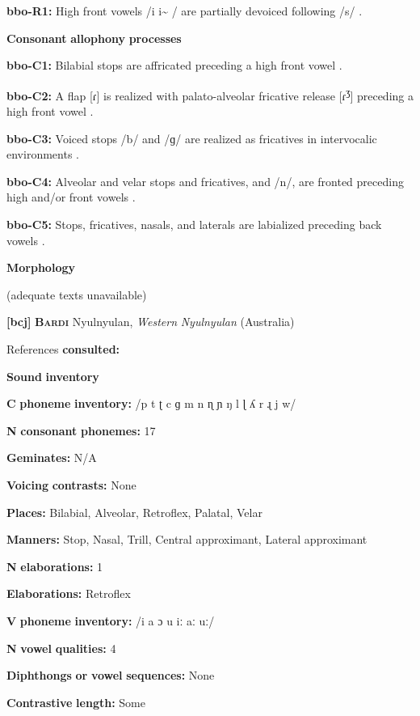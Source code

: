 \textbf{bbo-R1:} High front vowels /i i\~{} / are partially devoiced following /s/ \citep[28-9]{Morse1976}.

\textbf{Consonant} \textbf{allophony} \textbf{processes}

\textbf{bbo-C1:} Bilabial stops are affricated preceding a high front vowel \citep[20]{Morse1976}.

\textbf{bbo-C2:} A flap [ɾ] is realized with palato-alveolar fricative release [ɾ\textsuperscript{ʒ}] preceding a high front vowel \citep[25]{Morse1976}.

\textbf{bbo-C3:} Voiced stops /b/ and /ɡ/ are realized as fricatives in intervocalic environments \citep[22]{Morse1976}.

\textbf{bbo-C4:} Alveolar and velar stops and fricatives, and /n/, are fronted preceding high and/or front vowels \citep[20-23]{Morse1976}.

\textbf{bbo-C5:} Stops, fricatives, nasals, and laterals are labialized preceding back vowels \citep[20]{Morse1976}.

\textbf{Morphology}

(adequate texts unavailable)

\textbf{[bcj]}   \textbf{\textsc{Bardi}  }  Nyulnyulan, \textit{Western} \textit{Nyulnyulan} (Australia)

References \textbf{consulted:} \citet{Bowern2012}

\textbf{Sound} \textbf{inventory}

\textbf{C} \textbf{phoneme} \textbf{inventory:} /p t ʈ c ɡ m n ɳ ɲ ŋ l ɭ ʎ r ɻ j w/

\textbf{N} \textbf{consonant} \textbf{phonemes:} 17

\textbf{Geminates:} N/A

\textbf{Voicing} \textbf{contrasts:} None

\textbf{Places:} Bilabial, Alveolar, Retroflex, Palatal, Velar

\textbf{Manners:} Stop, Nasal, Trill, Central approximant, Lateral approximant

\textbf{N} \textbf{elaborations:} 1

\textbf{Elaborations:} Retroflex

\textbf{V} \textbf{phoneme} \textbf{inventory:} /i a ɔ u iː aː uː/

\textbf{N} \textbf{vowel} \textbf{qualities:} 4

\textbf{Diphthongs} \textbf{or} \textbf{vowel} \textbf{sequences:} None

\textbf{Contrastive} \textbf{length:} Some

